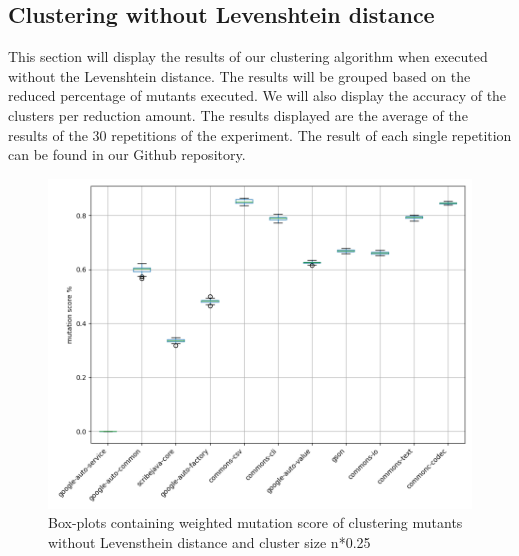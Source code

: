 \documentclass[../../main]{subfiles}
\begin{document}

\subsection{Clustering without Levenshtein distance}
This section will display the results of our clustering algorithm when executed without the Levenshtein distance.
The results will be grouped based on the reduced percentage of mutants executed.
We will also display the accuracy of the clusters per reduction amount.
The results displayed are the average of the results of the 30 repetitions of the experiment.
The result of each single repetition can be found in our Github repository\cite{rbasarat-repo}.

\begin{figure}[H]
\includegraphics[width=\textwidth]{images/boxplot_summary/boxplot_hc_no_distance_0.25.png}
\caption{\label{box:clustering_no_distance_25}Box-plots containing weighted mutation score of clustering mutants without Levensthein distance and cluster size n*0.25}
\end{figure}
\end{document}
